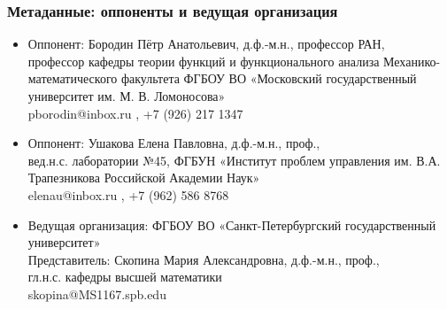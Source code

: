 \begin{frame}\frametitle{Метаданные: оппоненты и ведущая организация}
	\begin{itemize}
		\item
			Оппонент: Бородин Пётр Анатольевич, д.ф.-м.н., профессор РАН,
			\\
			профессор кафедры теории функций и функционального анализа Механико-математического факультета
			ФГБОУ ВО «Московский государственный университет им. М. В. Ломоносова»
			\\
			pborodin@inbox.ru , +7 (926) 217 1347
		\item
			Оппонент: Ушакова Елена Павловна, д.ф.-м.н., проф.,
			\\
			вед.н.с. лаборатории №45,
			ФГБУН «Институт проблем управления им. В.А. Трапезникова Российской Академии Наук»
			\\
			elenau@inbox.ru , +7 (962) 586 8768
		\item
			Ведущая организация:
			ФГБОУ ВО «Санкт-Петербургский государственный университет»
			\\
			Представитель:
			Скопина Мария Александровна, д.ф.-м.н., проф.,
			\\
			гл.н.с. кафедры высшей математики
			\\
			skopina@MS1167.spb.edu
	\end{itemize}
\end{frame}
